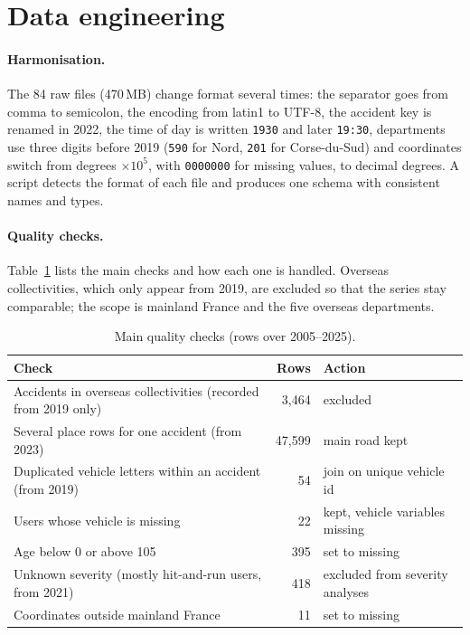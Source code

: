 \documentclass[11pt,a4paper]{article}
\begin{document}
\section{Data engineering}

\paragraph{Harmonisation.} The 84 raw files (470\,MB) change format several times: the separator goes
from comma to semicolon, the encoding from latin1 to UTF-8, the accident key is renamed in 2022, the time
of day is written \texttt{1930} and later \texttt{19:30}, departments use three digits before 2019
(\texttt{590} for Nord, \texttt{201} for Corse-du-Sud) and coordinates switch from degrees $\times 10^5$,
with \texttt{0000000} for missing values, to decimal degrees. A script detects the format of each file and
produces one schema with consistent names and types.

\paragraph{Quality checks.} Table~\ref{tab:quality} lists the main checks and how each one is handled.
Overseas collectivities, which only appear from 2019, are excluded so that the series stay comparable;
the scope is mainland France and the five overseas departments.

\begin{table}[H]
\centering\small
\caption{Main quality checks (rows over 2005--2025).}
\label{tab:quality}
\begin{tabular}{@{}lrl@{}}
\toprule
Check & Rows & Action \\
\midrule
Accidents in overseas collectivities (recorded from 2019 only) & 3,464 & excluded \\
Several place rows for one accident (from 2023) & 47,599 & main road kept \\
Duplicated vehicle letters within an accident (from 2019) & 54 & join on unique vehicle id \\
Users whose vehicle is missing & 22 & kept, vehicle variables missing \\
Age below 0 or above 105 & 395 & set to missing \\
Unknown severity (mostly hit-and-run users, from 2021) & 418 & excluded from severity analyses \\
Coordinates outside mainland France & 11 & set to missing \\
\bottomrule
\end{tabular}
\end{table}
\end{document}

